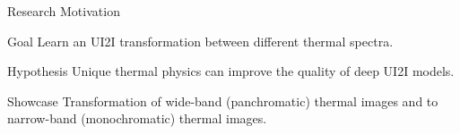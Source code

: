 \begin{frame}{Research Motivation}
  \vspace{-0.5cm}
  \begin{exampleblock}{Goal}
    Learn an UI2I transformation between different thermal spectra.
  \end{exampleblock} 
  \begin{exampleblock}{Hypothesis}
    Unique thermal physics can improve the quality of deep UI2I models.
  \end{exampleblock}  
  \begin{exampleblock}{Showcase}
    Transformation of wide-band (panchromatic) thermal images and to narrow-band (monochromatic) thermal images.
  \end{exampleblock}
\end{frame}